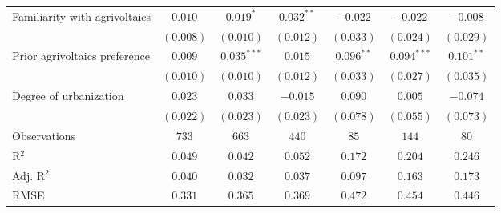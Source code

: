 \begin{center}
\begin{small}
\begin{longtable}{l@{} c@{} c@{} c@{} c@{} c@{} c@{}}
\quad Familiarity with agrivoltaics & $0.010$        & $0.019^{*}$      & $0.032^{**}$  & $-0.022$         & $-0.022$      & $-0.008$     \\
                                    & $(0.008)$      & $(0.010)$        & $(0.012)$     & $(0.033)$        & $(0.024)$     & $(0.029)$    \\
\quad Prior agrivoltaics preference & $0.009$        & $0.035^{***}$    & $0.015$       & $0.096^{**}$     & $0.094^{***}$ & $0.101^{**}$ \\
                                    & $(0.010)$      & $(0.010)$        & $(0.012)$     & $(0.033)$        & $(0.027)$     & $(0.035)$    \\
\quad Degree of urbanization        & $0.023$        & $0.033$          & $-0.015$      & $0.090$          & $0.005$       & $-0.074$     \\
                                    & $(0.022)$      & $(0.023)$        & $(0.023)$     & $(0.078)$        & $(0.055)$     & $(0.073)$    \\
\hline
Observations                        & $733$          & $663$            & $440$         & $85$             & $144$         & $80$         \\
R$^2$                               & $0.049$        & $0.042$          & $0.052$       & $0.172$          & $0.204$       & $0.246$      \\
Adj. R$^2$                          & $0.040$        & $0.032$          & $0.037$       & $0.097$          & $0.163$       & $0.173$      \\
RMSE                                & $0.331$        & $0.365$          & $0.369$       & $0.472$          & $0.454$       & $0.446$      \\
\end{longtable}
\end{small}
\end{center}
